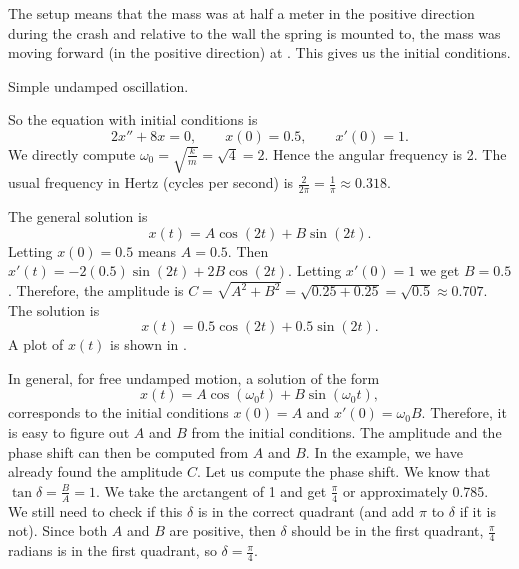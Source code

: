 \documentclass{ximera}
\begin{document}
\begin{exampleSol}
    The setup means that the mass was at half a meter in the positive direction during the crash and relative to the wall the spring is mounted to, the mass was moving forward (in the positive direction) at .  This gives us the initial conditions.
    
    \begin{mywrapfig}[15]{3.25in}
        \capstart
        \caption{Simple undamped oscillation.\label{mv:undampedfig}}
    \end{mywrapfig}
    
    So the equation with initial conditions is
    \begin{equation*}
        2 x'' + 8 x = 0 , \qquad x(0) = 0.5, \qquad x'(0) = 1.
    \end{equation*}
    We directly compute $\omega_0 = \sqrt{\frac{k}{m}} = \sqrt{4} = 2$. Hence the angular frequency is 2.  The usual frequency in Hertz (cycles per second) is $\frac{2}{2\pi} = \frac{1}{\pi} \approx 0.318$.
    
    The general solution is
    \begin{equation*}
        x(t) = A \cos (2t) + B \sin (2t) .
    \end{equation*}
    Letting $x(0) = 0.5$ means $A = 0.5$.  Then $x'(t) = - 2(0.5) \sin (2t) + 2B \cos (2t)$. Letting $x'(0) = 1$ we get $B = 0.5$.  Therefore, the amplitude is $C = \sqrt{A^2+B^2} = \sqrt{0.25+0.25} = \sqrt{0.5} \approx 0.707$.  The solution is
    \begin{equation*}
        x(t) = 0.5 \cos (2t) + 0.5 \sin (2t) .
    \end{equation*}
    A plot of $x(t)$ is shown in .
\end{exampleSol}

In general, for free undamped motion, a solution of the form
\begin{equation*}
    x(t) = A \cos (\omega_0 t) + B \sin (\omega_0 t) ,
\end{equation*}
corresponds to the initial conditions $x(0) = A$ and $x'(0) = \omega_0 B$. Therefore, it is easy to figure out $A$ and $B$ from the initial conditions. The amplitude and the phase shift can then be computed from $A$ and $B$. In the example, we have already found the amplitude $C$.  Let us compute the phase shift.  We know that $\tan \delta = \frac{B}{A} = 1$.  We take the arctangent of 1 and get $\frac{\pi}{4}$ or approximately 0.785. We still need to check if this $\delta$ is in the correct quadrant (and add $\pi$ to $\delta$ if it is not). Since both $A$ and $B$ are positive, then $\delta$ should be in the first quadrant, $\frac{\pi}{4}$ radians is in the first quadrant, so $\delta = \frac{\pi}{4}$.
\end{document}
